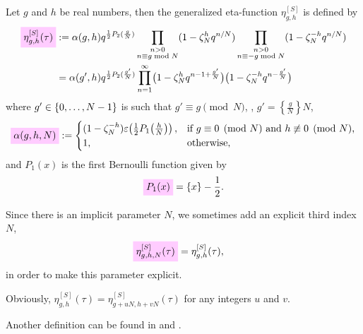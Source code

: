 \documentclass{article}
\begin{document}
\begin{Definition}
  \cite{Schoeneberg:EllipticModularFunctions:1974} Let $g$ and $h$ be
  real numbers, then the generalized eta-function $\eta_{g,h}^{[S]}$
  is defined by
\begin{align}
  \defineNotation[eta-g-h-tau-Schoeneberg]{\eta_{g,h}^{[S]}(\tau)}
  &:=
  \alpha(g,h) q^{\frac{1}{2} P_2(\frac{g}{N})}
  \prod_{\substack{n>0\\n\equiv g \bmod N}}
       (1-\zeta_N^h q^{n/N})
  \prod_{\substack{n>0\\n\equiv -g \bmod N}}
       (1-\zeta_N^{-h} q^{n/N})
  \notag\\
  &=
  \alpha(g',h) q^{\frac{1}{2} P_2(\frac{g'}{N})}
  \prod_{n=1}^\infty
    \bigl(1-\zeta_N^h q^{n-1 + \frac{g'}{N}}\bigr)
    \bigl(1-\zeta_N^{-h} q^{n - \frac{g'}{N}}\bigr)
  \label{eq:eta_g-h^[S](tau)}
\end{align}
where $g'\in\left\{0,\ldots,N-1\right\}$ is such that $g' \equiv g \pmod{N}$,
\ie, $g' = \left\{\frac{g}{N}\right\} N$,
\begin{gather}
  \defineNotation[alpha-g-h-N]{\alpha(g,h,N)}
  :=
  \begin{cases}
    (1 - \zeta_N^{-h}) \unityPower{\frac{1}{2} P_1\!\left(\frac{h}{N}\right)},
    &
    \text{if $g\equiv0\pmod{N}$ and $h\not\equiv0\pmod{N}$,}
    \\
    1, & \text{otherwise},
  \end{cases}
  \label{eq:eta_g-h^[S](tau)-prefactor}
\end{gather}
and $P_1(x)$ is the first Bernoulli function given by
\begin{gather*}
  \defineNotation[P-1]{P_1(x)}
  =
  \{x\} - \frac{1}{2}.
\end{gather*}

Since there is an implicit parameter $N$, we sometimes add an explicit
third index $N$, \ie
\begin{align}
  \label{eq:eta_g-h-N^[S](tau)}
  \defineNotation[eta-g-h-N-tau-Schoeneberg]{\eta_{g,h,N}^{[S]}(\tau)}
  &=
  \eta_{g,h}^{[S]}(\tau),
\end{align}
in order to make this parameter explicit.
\end{Definition}

Obviously, $\eta_{g,h}^{[S]}(\tau) = \eta_{g+uN,h+vN}^{[S]}(\tau)$ for
any integers $u$ and $v$.

Another definition can be found in
\cite{Robins:GeneralizedDedekindEtaProducts:1994} and
\cite{Chen+Du+Zhao:FindingModularFunctionsRamanujan:2019}.
\end{document}
